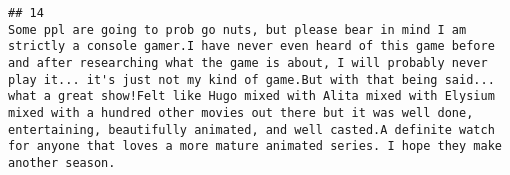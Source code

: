 \documentclass[
]{article}
\begin{document}
\begin{verbatim}
## 14                                                                                                                                                                                                                                                                                                                                                                                                                                                                                                                                                                                                                                                                                                                                                                                                                                                                                                                                                                                                                                                                                                                                                                                                                                                                                                                                                                                                                                                                                                                                                                                                                                                                                                                                                                                                                                                                                                                                                                                                                                                                                                                                                                                                                                                                                                                                                                                                                                                                                 Some ppl are going to prob go nuts, but please bear in mind I am strictly a console gamer.I have never even heard of this game before and after researching what the game is about, I will probably never play it... it's just not my kind of game.But with that being said... what a great show!Felt like Hugo mixed with Alita mixed with Elysium mixed with a hundred other movies out there but it was well done, entertaining, beautifully animated, and well casted.A definite watch for anyone that loves a more mature animated series. I hope they make another season.

\end{verbatim}
\end{document}
